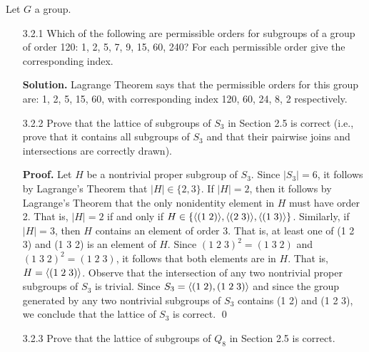 Let $G$ a group.

\begin{enumerate}
   \item[3.2.1]   Which of the following are permissible orders for subgroups of
                  a group of order 120: 1, 2, 5, 7, 9, 15, 60, 240? For each
                  permissible order give the corresponding index.

      \textbf{Solution.} Lagrange Theorem says that the permissible orders for
      this group are: 1, 2, 5, 15, 60, with corresponding index 120, 60, 24, 8,
      2 respectively.
   \item[3.2.2]   Prove that the lattice of subgroups of $S_3$ in Section 2.5 is
                  correct (i.e., prove that it contains all subgroups of $S_3$
                  and that their pairwise joins and intersections are correctly  
                  drawn).

      \textbf{Proof.} Let $H$ be a nontrivial proper subgroup of $S_3$. Since
      $|S_3| = 6$, it follows by Lagrange's Theorem that $|H| \in \{2, 3\}$. If
      $|H| = 2$, then it follows by Lagrange's Theorem that the only nonidentity
      element in $H$ must have order 2. That is, $|H| = 2$ if and only if
      $H \in \{\langle (1\;2) \rangle, \langle (2\;3) \rangle, \langle (1\;3) \rangle\}$. 
      Similarly, if $|H| = 3$, then $H$ contains an element of order 3. That is, 
      at least one of (1 2 3) and (1 3 2) is an element of $H$. Since
      $(1\;2\;3)^2 = (1\;3\;2)$ and $(1\;3\;2)^2 = (1\;2\;3)$, it follows that 
      both elements are in $H$. That is, $H = \langle (1\;2\;3) \rangle$. Observe that the 
      intersection of any two nontrivial proper subgroups of $S_3$ is trivial.
      Since $S_3 = \langle (1\;2), (1\;2\;3) \rangle$ and since the group generated by any
      two nontrivial subgroups of $S_3$ contains (1 2) and (1 2 3), we conclude 
      that the lattice of $S_3$ is correct. \qed
   \item[3.2.3]   Prove that the lattice of subgroups of $Q_8$ in Section 2.5 is
                  correct.


\end{enumerate}
